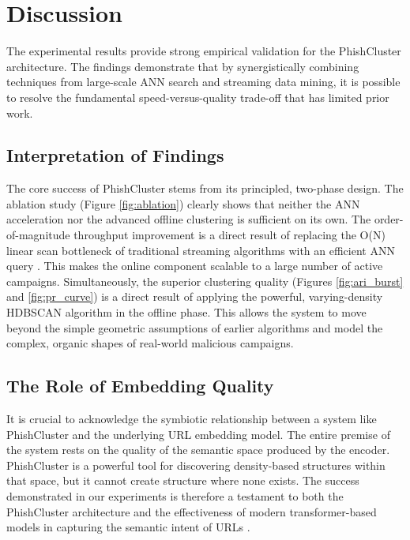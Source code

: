 \documentclass[journal,article,submit,pdftex,moreauthors]{Definitions/mdpi}
\begin{document}
\section{Discussion}

The experimental results provide strong empirical validation for the PhishCluster architecture. The findings demonstrate that by synergistically combining techniques from large-scale ANN search and streaming data mining, it is possible to resolve the fundamental speed-versus-quality trade-off that has limited prior work.

\subsection{Interpretation of Findings}

The core success of PhishCluster stems from its principled, two-phase design. The ablation study (Figure \ref{fig:ablation}) clearly shows that neither the ANN acceleration nor the advanced offline clustering is sufficient on its own. The order-of-magnitude throughput improvement is a direct result of replacing the O(N) linear scan bottleneck of traditional streaming algorithms with an efficient ANN query \cite{ref_subramanya}. This makes the online component scalable to a large number of active campaigns. Simultaneously, the superior clustering quality (Figures \ref{fig:ari_burst} and \ref{fig:pr_curve}) is a direct result of applying the powerful, varying-density HDBSCAN algorithm in the offline phase. This allows the system to move beyond the simple geometric assumptions of earlier algorithms and model the complex, organic shapes of real-world malicious campaigns.

\subsection{The Role of Embedding Quality}

It is crucial to acknowledge the symbiotic relationship between a system like PhishCluster and the underlying URL embedding model. The entire premise of the system rests on the quality of the semantic space produced by the encoder. PhishCluster is a powerful tool for discovering density-based structures within that space, but it cannot create structure where none exists. The success demonstrated in our experiments is therefore a testament to both the PhishCluster architecture and the effectiveness of modern transformer-based models in capturing the semantic intent of URLs \cite{ref_reimers, ref_wang_minilm}.
\end{document}
